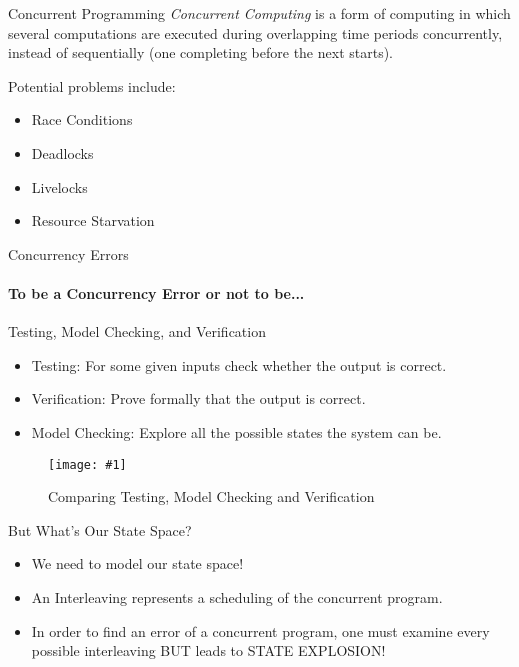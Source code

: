 \documentclass[9pt]{beamer}
\newcommand{\trace}[2]{
\begin{figure}[H]
\centering
\texttt{[image: \#1]}
\caption{#2}
\label{#2}
\end{figure}
}
\newcommand{\Code}[2]{
  \begin{minipage}{\linewidth}
  
  \label{#2}
  \end{minipage}
 }
\begin{document}
\begin{frame}{Concurrent Programming}
\emph{Concurrent Computing} is a form of computing in which several computations are executed during
overlapping time periods concurrently, instead of sequentially (one completing before the next starts).

Potential problems include:
\pause
\begin{itemize}[<+->]
\item Race Conditions
\item Deadlocks
\item Livelocks
\item Resource Starvation
\end{itemize}

\end{frame}

\begin{frame}{Concurrency Errors}
\framesubtitle{ To be a Concurrency Error or not to be...}

\Code{../code/zero.c}{Example of non-concurrency error}

\Code{../code/zeroconc.c}{Example of concurrency error}

\end{frame}

\begin{frame}{Testing, Model Checking, and Verification}
\begin{itemize}
\item Testing: For some given inputs check whether the output is correct.
\item Verification: Prove formally that the output is correct.
\item Model Checking: Explore all the possible states the system can be.

\end{itemize}

\trace{../img/testmodver.png}{Comparing Testing, Model Checking and Verification}
    
\end{frame}

\begin{frame}{But What's Our State Space?}

\begin{itemize}[<+->]
    \item We need to model our state space!
    \item An Interleaving represents a scheduling of the concurrent program.
    \item In order to find an error of a concurrent program, one must examine every possible interleaving BUT leads to STATE EXPLOSION!
\end{itemize}
    

\end{frame}
\end{document}
